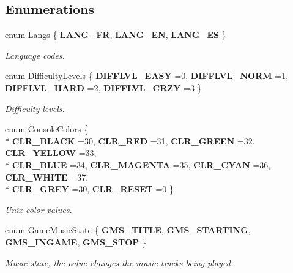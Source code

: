 \subsection*{Enumerations}
\begin{DoxyCompactItemize}
\item 
enum \hyperlink{namespace_chase_game_a2501a45afa3eb11b10e04d79a8349796}{Langs} \{ {\bfseries L\-A\-N\-G\-\_\-\-F\-R}, 
{\bfseries L\-A\-N\-G\-\_\-\-E\-N}, 
{\bfseries L\-A\-N\-G\-\_\-\-E\-S}
 \}
\begin{DoxyCompactList}\small\item\em Language codes. \end{DoxyCompactList}\item 
enum \hyperlink{namespace_chase_game_a5d785ea23167a3b7e44e045097cd457e}{Difficulty\-Levels} \{ {\bfseries D\-I\-F\-F\-L\-V\-L\-\_\-\-E\-A\-S\-Y} =0, 
{\bfseries D\-I\-F\-F\-L\-V\-L\-\_\-\-N\-O\-R\-M} =1, 
{\bfseries D\-I\-F\-F\-L\-V\-L\-\_\-\-H\-A\-R\-D} =2, 
{\bfseries D\-I\-F\-F\-L\-V\-L\-\_\-\-C\-R\-Z\-Y} =3
 \}
\begin{DoxyCompactList}\small\item\em Difficulty levels. \end{DoxyCompactList}\item 
enum \hyperlink{namespace_chase_game_a5acdf639e912d1e78814b7fae21afc7b}{Console\-Colors} \{ \\*
{\bfseries C\-L\-R\-\_\-\-B\-L\-A\-C\-K} =30, 
{\bfseries C\-L\-R\-\_\-\-R\-E\-D} =31, 
{\bfseries C\-L\-R\-\_\-\-G\-R\-E\-E\-N} =32, 
{\bfseries C\-L\-R\-\_\-\-Y\-E\-L\-L\-O\-W} =33, 
\\*
{\bfseries C\-L\-R\-\_\-\-B\-L\-U\-E} =34, 
{\bfseries C\-L\-R\-\_\-\-M\-A\-G\-E\-N\-T\-A} =35, 
{\bfseries C\-L\-R\-\_\-\-C\-Y\-A\-N} =36, 
{\bfseries C\-L\-R\-\_\-\-W\-H\-I\-T\-E} =37, 
\\*
{\bfseries C\-L\-R\-\_\-\-G\-R\-E\-Y} =30, 
{\bfseries C\-L\-R\-\_\-\-R\-E\-S\-E\-T} =0
 \}
\begin{DoxyCompactList}\small\item\em Unix color values. \end{DoxyCompactList}\item 
enum \hyperlink{namespace_chase_game_a85936e0bdb5509ede7ebb2543de5be42}{Game\-Music\-State} \{ {\bfseries G\-M\-S\-\_\-\-T\-I\-T\-L\-E}, 
{\bfseries G\-M\-S\-\_\-\-S\-T\-A\-R\-T\-I\-N\-G}, 
{\bfseries G\-M\-S\-\_\-\-I\-N\-G\-A\-M\-E}, 
{\bfseries G\-M\-S\-\_\-\-S\-T\-O\-P}
 \}
\begin{DoxyCompactList}\small\item\em Music state, the value changes the music tracks being played. \end{DoxyCompactList}\end{DoxyCompactItemize}
